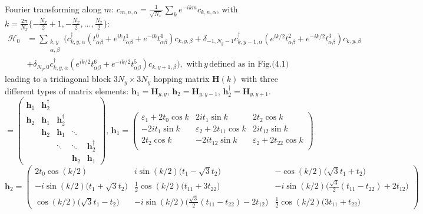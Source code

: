 Fourier transforming along $m$: $c_{m, n, \alpha} = \frac{1}{\sqrt{N_x}}\sum_{k} e^{-i k m } c_{k, n, \alpha} $, with $k = \frac{2\pi}{N_x} \{ -\frac{N_x}{2} + 1, -\frac{N_x}{2}, ..., \frac{N_x}{2} \}$:
\begin{equation}
\begin{split}
\mathcal{H}_0 &= \sum_{ \substack{k, y \\ \alpha, \beta} } \bigg( c_{k, y, \alpha}^\dagger (t_{\alpha \beta}^0  + e^{ik} t_{\alpha \beta}^1 + e^{-ik} t_{\alpha \beta}^4 )  c_{k, y, \beta} + \delta_{-1, N_y -1} c_{k, y - 1, \alpha}^\dagger ( e^{ik/2} t_{\alpha \beta}^2 + e^{-ik/2} t_{\alpha \beta}^3 ) c_{k, y, \beta} \\
& + \delta_{N_y, 0} c_{k, y, \alpha}^\dagger ( e^{ik/2} t_{\alpha \beta}^6 + e^{-ik/2} t_{\alpha \beta}^5 ) c_{k, y+1, \beta} \bigg) , \,\, \text{with} \, y \, \text{defined as in Fig.(4.1)}
\end{split}
\end{equation}
leading to a tridiagonal block $3 N_y \times 3 N_y$ hopping matrix $\bm H (k)$ with three different types of matrix elements: $\bm h_1 = \bm H_{y,y}$, $\bm h_2 = \bm H_{y,y-1}$, $\bm h_2^\dagger = \bm H_{y, y+1}$.
\begin{equation}
[ H_{(\alpha y) (\beta y')} (k) ] = 
\begin{pmatrix}
\bm h_1 & \bm h_2^\dagger & & & \\
\bm h_2 & \bm h_1 & \bm h_2^\dagger & & \\
& \bm h_2 & \bm h_1 & \ddots & \\
& & \ddots & \ddots & \bm h_2^\dagger \\
& & & \bm h_2 & \bm h_1
\end{pmatrix}, \, 
\bm h_1 = 
\begin{pmatrix}
\varepsilon_1 + 2 t_0 \cos k & 2 i t_1 \sin k & 2 t_2 \cos k \\
-2 i t_1 \sin k & \varepsilon_2 + 2 t_{11} \cos k & 2 i t_{12} \sin k \\
2 t_2 \cos k& -2 i t_{12} \sin k & \varepsilon_2 + 2 t_{22} \cos k \\
\end{pmatrix}
\end{equation}
\begin{equation*}
\bm h_2 =
\begin{pmatrix}
2 t_0 \cos ( k / 2 ) & i \sin ( k / 2 ) \bigg( t_1 - \sqrt{3} t_2 \bigg) & - \cos (k /2 ) \bigg( \sqrt{3} t_1 + t_2 \bigg) \\
-i \sin ( k / 2 ) \bigg(t_1 + \sqrt{3} t_2 \bigg) & \frac{1}{2} \cos (k / 2) \bigg( t_{11} + 3 t_{22} \bigg) & -i \sin (k / 2) \bigg( \frac{\sqrt{3}}{2} (t_{11} -  t_{22} ) + 2 t_{12} \bigg) \\
\cos ( k / 2) \bigg( \sqrt{3} t_1 - t_2 \bigg) & -i \sin (k / 2) \bigg( \frac{\sqrt{3}}{2} ( t_{11} - t_{22} ) - 2 t_{12} \bigg) & \frac{1}{2} \cos (k / 2) \bigg( 3 t_{11	} + t_{22} \bigg)
\end{pmatrix}
\end{equation*}

